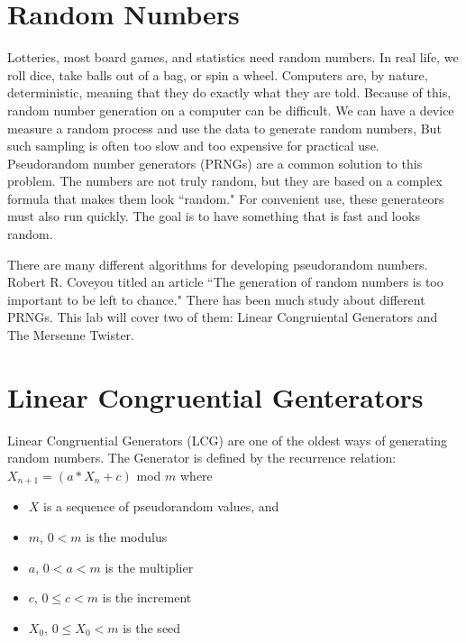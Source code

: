 \label{Ch:PRNG}


\section*{Random Numbers}

Lotteries, most board games, and statistics need random numbers.
In real life, we roll dice, take balls out of a bag, or spin a wheel.
Computers are, by nature, deterministic, meaning that they do exactly what they are told.
Because of this, random number generation on a computer can be difficult.
We can have a device measure a random process and use the data to generate random numbers, 
But such sampling is often too slow and too expensive for practical use.
Pseudorandom number generators (PRNGs) are a common solution to this problem.
The numbers are not truly random, but they are based on a complex formula that makes them look ``random."
For convenient use, these generateors must also run quickly.
The goal is to have something that is fast and looks random.

There are many different algorithms for developing pseudorandom numbers.
Robert R. Coveyou titled an article ``The generation of random numbers is too important to be left to chance."
There has been much study about different PRNGs.
This lab will cover two of them: Linear Congruiental Generators and The Mersenne Twister.

\section*{Linear Congruential Genterators}

Linear Congruential Generators (LCG) are one of the oldest ways of generating random numbers.
The Generator is defined by the recurrence relation:
$X_{n+1}=(a*X_n + c)$ mod $m$ where

\begin{itemize}
\item $X$ is a sequence of pseudorandom values, and
\item $m$, $0<m$ is the modulus
\item $a$, $0<a<m$ is the multiplier
\item $c$, $0\leq c<m$ is the increment
\item $X_0$, $0\leq X_0 <m$ is the seed
\end{itemize}

